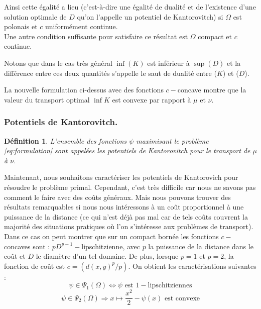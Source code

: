 \documentclass[
    8.2pt,
    a4paper,
    logo,
    twocolumn
]{template}
\newtheorem{definition}{Définition}
\begin{document}
    Ainsi cette égalité a lieu (c’est-à-dire une égalité de dualité et de l’existence d’une solution optimale de $D$ qu’on l’appelle un potentiel de Kantorovitch) si $\Omega$ est polonais et $c$ uniformément continue. \citep{Notes}\\
    Une autre condition suffisante pour satisfaire ce résultat est $\Omega$ compact et $c$ continue. \citep{santambrogio_introduction_2010}

    Notons que dans le cas très général $\inf (K)$ est inférieur à $\sup (D)$ et la différence entre ces deux quantités s’appelle le saut de dualité entre ($K$) et ($D$).

    La nouvelle formulation ci-dessus avec des fonctions $c-$concave montre que la valeur du transport optimal $\inf K$ est convexe par rapport à $\mu$ et $\nu$.

    \subsubsection{Potentiels de Kantorovitch.}
    \begin{definition}
        L'ensemble des fonctions $\psi$ maximisant le problème \ref{eq:formulation} sont appelées les potentiels de Kantorovitch pour le transport de $\mu$ à $\nu$.
    \end{definition}
    Maintenant, nous souhaitons caractériser les potentiels de Kantorovich pour résoudre le problème primal. Cependant, c'est très difficile car nous ne savons pas comment le faire avec des coûts généraux. Mais nous pouvons trouver des résultats remarquables si nous nous intéressons à un coût proportionnel à une puissance de la distance (ce qui n'est déjà pas mal car de tels coûts couvrent la majorité des situations pratiques où l'on s'intéresse aux problèmes de transport). \\
    Dans ce cas on peut montrer \citep{santambrogio_optimal_2015} que sur un compact bornée les fonctions $c-$concaves sont : $pD^{p-1}-$lipschitzienne, avec $p$ la puissance de la distance dans le coût et $D$ le diamètre d’un tel domaine. De plus, lorsque $p=1$ et $p=2$, la fonction de coût est $c = \left( d(x,y)^p /p\right)$. On obtient les caractérisations suivantes :
    \begin{equation*}
        \psi \in \Psi_{1}{(\Omega)} \Longleftrightarrow \psi \text{ est } 1- \text{lipschitziennes}
    \end{equation*}
    \begin{equation} \label{eq:1}
        \psi \in \Psi_{2    }{(\Omega)} \Longrightarrow x\mapsto \frac{x^2}{2}-\psi(x) \text{ est convexe}
    \end{equation}
\end{document}
